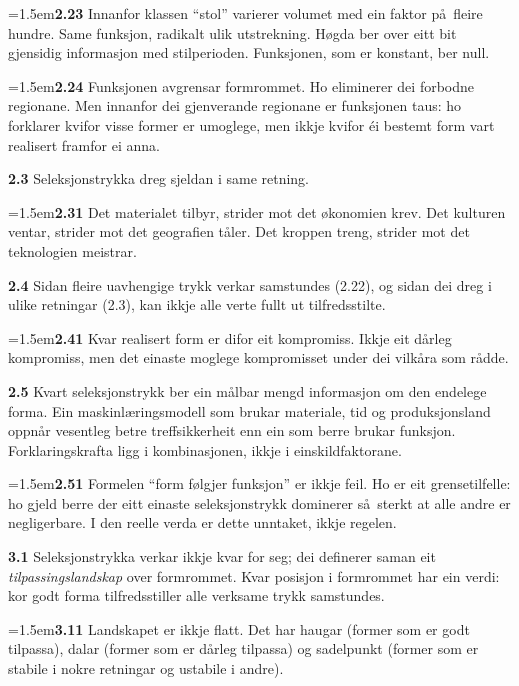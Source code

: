 \documentclass[11pt, a4paper]{article}
\newcommand{\prop}[1]{\bigskip\noindent{\Large\textbf{#1}}\medskip\par}
\newcommand{\subprop}[1]{\medskip\noindent\textbf{#1}\quad}
\newcommand{\subsubprop}[1]{\smallskip\hangindent=1.5em\noindent\hspace{1.5em}\textbf{#1}\quad}
\begin{document}
\subsubprop{2.23} Innanfor klassen ``stol'' varierer volumet med ein faktor p\aa\ fleire hundre. Same funksjon, radikalt ulik utstrekning. H\o gda ber over eitt bit gjensidig informasjon med stilperioden. Funksjonen, som er konstant, ber null.

\subsubprop{2.24} Funksjonen avgrensar formrommet. Ho eliminerer dei forbodne regionane. Men innanfor dei gjenverande regionane er funksjonen taus: ho forklarer kvifor visse former er umoglege, men ikkje kvifor \'ei bestemt form vart realisert framfor ei anna.

\subprop{2.3} Seleksjonstrykka dreg sjeldan i same retning.

\subsubprop{2.31} Det materialet tilbyr, strider mot det \o konomien krev. Det kulturen ventar, strider mot det geografien t\aa ler. Det kroppen treng, strider mot det teknologien meistrar.

\subprop{2.4} Sidan fleire uavhengige trykk verkar samstundes (2.22), og sidan dei dreg i ulike retningar (2.3), kan ikkje alle verte fullt ut tilfredsstilte.

\subsubprop{2.41} Kvar realisert form er difor eit kompromiss. Ikkje eit d\aa rleg kompromiss, men det einaste moglege kompromisset under dei vilk\aa ra som r\aa dde.

\subprop{2.5} Kvart seleksjonstrykk ber ein m\aa lbar mengd informasjon om den endelege forma. Ein maskinl\ae ringsmodell som brukar materiale, tid og produksjonsland oppn\aa r vesentleg betre treffsikkerheit enn ein som berre brukar funksjon. Forklaringskrafta ligg i kombinasjonen, ikkje i einskildfaktorane.

\subsubprop{2.51} Formelen ``form f\o lgjer funksjon'' er ikkje feil. Ho er eit grensetilfelle: ho gjeld berre der eitt einaste seleksjonstrykk dominerer s\aa\ sterkt at alle andre er negligerbare. I den reelle verda er dette unntaket, ikkje regelen.

\prop{3 Kreftene lagar eit tilpassingslandskap.}

\subprop{3.1} Seleksjonstrykka verkar ikkje kvar for seg; dei definerer saman eit \textit{tilpassingslandskap} over formrommet. Kvar posisjon i formrommet har ein verdi: kor godt forma tilfredsstiller alle verksame trykk samstundes.

\subsubprop{3.11} Landskapet er ikkje flatt. Det har haugar (former som er godt tilpassa), dalar (former som er d\aa rleg tilpassa) og sadelpunkt (former som er stabile i nokre retningar og ustabile i andre).
\end{document}
